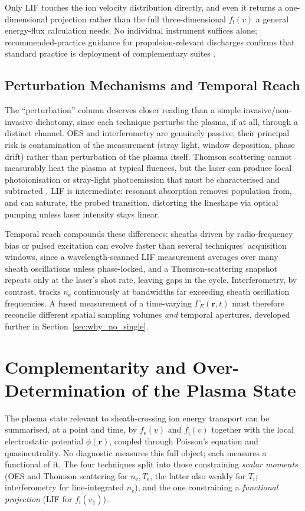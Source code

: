 Only LIF touches the ion velocity distribution directly, and even it returns a one-dimensional projection rather than the full three-dimensional $f_{\mathrm{i}}(v)$ a general energy-flux calculation needs. No individual instrument suffices alone; recommended-practice guidance for propulsion-relevant discharges confirms that standard practice is deployment of complementary suites \cite{ref0490,ref0511}.

\subsection{Perturbation Mechanisms and Temporal Reach}

The ``perturbation'' column deserves closer reading than a simple invasive/non-invasive dichotomy, since each technique perturbs the plasma, if at all, through a distinct channel. OES and interferometry are genuinely passive; their principal risk is contamination of the measurement (stray light, window deposition, phase drift) rather than perturbation of the plasma itself. Thomson scattering cannot measurably heat the plasma at typical fluences, but the laser can produce local photoionisation or stray-light photoemission that must be characterised and subtracted \cite{ref0384}. LIF is intermediate: resonant absorption removes population from, and can saturate, the probed transition, distorting the lineshape via optical pumping unless laser intensity stays linear.

Temporal reach compounds these differences: sheaths driven by radio-frequency bias or pulsed excitation can evolve faster than several techniques' acquisition windows, since a wavelength-scanned LIF measurement averages over many sheath oscillations unless phase-locked, and a Thomson-scattering snapshot repeats only at the laser's shot rate, leaving gaps in the cycle. Interferometry, by contrast, tracks $n_{\mathrm{e}}$ continuously at bandwidths far exceeding sheath oscillation frequencies. A fused measurement of a time-varying $\Gamma_{E}(\mathbf{r},t)$ must therefore reconcile different spatial sampling volumes \emph{and} temporal apertures, developed further in Section~\ref{sec:why_no_single}.

\section{Complementarity and Over-Determination of the Plasma State}
\label{sec:complementarity}

The plasma state relevant to sheath-crossing ion energy transport can be summarised, at a point and time, by $f_{\mathrm{e}}(v)$ and $f_{\mathrm{i}}(v)$ together with the local electrostatic potential $\phi(\mathbf{r})$, coupled through Poisson's equation and quasineutrality. No diagnostic measures this full object; each measures a functional of it. The four techniques split into those constraining \emph{scalar moments} (OES and Thomson scattering for $n_{\mathrm{e}}, T_{\mathrm{e}}$, the latter also weakly for $T_{\mathrm{i}}$; interferometry for line-integrated $n_{\mathrm{e}}$), and the one constraining a \emph{functional projection} (LIF for $f_{\mathrm{i}}(v_{\parallel})$).

